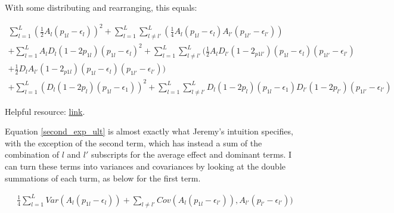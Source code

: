 \documentclass[a4paper,10pt]{article}
\begin{document}
With some distributing and rearranging, this equals: 

\begin{equation}
  \begin{split}
  \sum^L_{l=1}( \frac{1}{2}A_l(p_{1l}-\epsilon_l))^2+\sum^L_{l=1}\sum^L_{
    l \neq l'}(\frac{1}{4}A_l(p_{1l}-\epsilon_{l})A_{l'}(p_{1l'}-\epsilon_{l'}))
  \\
  +\sum^L_{l=1}A_lD_l(1-2p_{1l})(p_{1l}-\epsilon_l)^2 +
  \sum^L_{l=1}\sum^L_{l \neq
    l'}(\frac{1}{2}A_lD_{l'}(1-2_{p1l'})(p_{1l}-\epsilon_l)(p_{1l'}-\epsilon_{l'}) \\
  + \frac{1}{2}D_lA_{l'}(1-2_{p1l})(p_{1l}-\epsilon_l)(p_{1l'}-\epsilon_{l'})) \\
   + \sum^L_{l=1} (D_l(1-2p_l)(p_{1l}-\epsilon_{1}))^2
   + \sum^L_{l=1}\sum^L_{l \neq
     l'}D_{l}(1-2p_{l})(p_{1l}-\epsilon_{1})D_{l'}(1-2p_{l'})(p_{1l'}-\epsilon_{l'}) \label{second_exp_ult}
  \end{split}
\end{equation}

Helpful resource:
\href{http://www.statpower.net/Content/310/Summation%20Algebra.pdf}{link}.  

Equation \eqref{second_exp_ult} is almost exactly what Jeremy's
intuition specifies, with the exception of the second term, which
has instead a sum of the combination of $l$ and $l'$ subscripts for
the average effect and dominant terms. I
can turn these terms into variances and covariances by looking at the
double summations of each turm, as below for the first term. 

\begin{equation}
  \begin{split}
\frac{1}{4}\sum^L_{l=1}Var(A_l(p_{1l}-\epsilon_l)) + \sum_{l \neq
  l'}Cov(A_l(p_{1l}-\epsilon_{l'})), A_{l'}(p_{l'}-\epsilon_{l'}))
  \end{split}
\end{equation}

    


\end{document}
